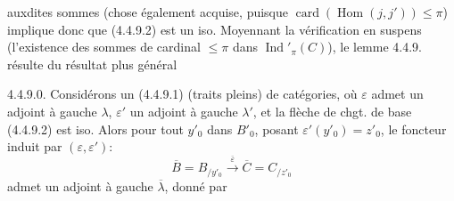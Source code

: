 auxdites sommes  (chose également  acquise, puisque $\operatorname{card}(\operatorname{Hom}(j,j'))\leq\pi$) implique donc que (4.4.9.2) est un iso.  Moyennant la vérification en suspens (l'existence des sommes de cardinal $\leq\pi$ dans $\operatorname{Ind}'_{\pi}(C)$), le lemme 4.4.9. résulte du résultat plus général

  4.4.9.0. Considérons un   (4.4.9.1) (traits pleins) de catégories, où $\varepsilon$ admet un adjoint à gauche $\lambda$, $\varepsilon'$ un adjoint à gauche $\lambda'$, et la flèche de chgt. de base (4.4.9.2) est iso. Alors pour tout $y'_0$ dans $B'_0$, posant $\varepsilon'(y'_0)=z'_0$, le foncteur induit par $(\varepsilon,\varepsilon')$:
\[
\overline B=B_{/y'_0}\xrightarrow{\overline\varepsilon}\overline C=C_{/z'_0}
\]
admet un adjoint à gauche $\overline\lambda$, donné par

